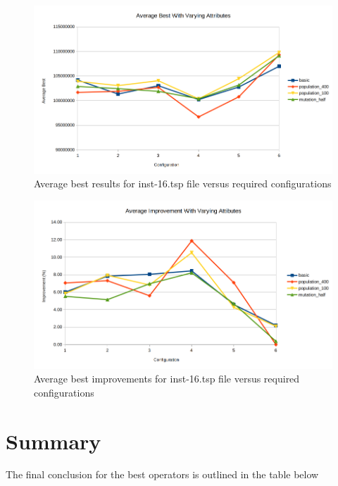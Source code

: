 \begin{figure}[H]
\vspace{-5pt}
\centering
\includegraphics[width=1.0\textwidth]{images/inst-16-average-best.png}
\caption{\label{fig:inst-16-average-best}Average best results for inst-16.tsp file versus required configurations}
\end{figure}

\begin{figure}[H]
\vspace{-5pt}
\centering
\includegraphics[width=1.0\textwidth]{images/inst-16-best-improvements.png}
\caption{\label{fig:inst-16-best-improvements}Average best improvements for inst-16.tsp file versus required configurations}
\end{figure}

\section{Summary}

The final conclusion for the best operators is outlined in the table below

